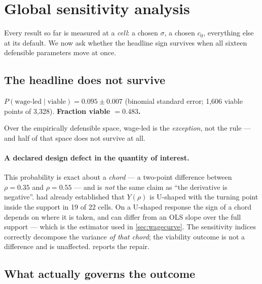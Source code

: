 
\section{Global sensitivity analysis}
\label{sec:sa}

Every result so far is measured at a \emph{cell}: a chosen $\sigma$, a chosen
$c_0$, everything else at its default. We now ask whether the headline sign
survives when all sixteen defensible parameters move at once.

\subsection{The headline does not survive}

\begin{declbox}
\textbf{$P(\text{wage-led} \mid \text{viable}) = 0.095 \pm 0.007$}
(binomial standard error; 1{,}606 viable points of 3{,}328).
\textbf{Fraction viable $= 0.483$.}

\smallskip
Over the empirically defensible space, wage-led is the \emph{exception}, not
the rule --- and half of that space does not survive at all.
\end{declbox}

\paragraph{A declared design defect in the quantity of interest.}
This probability is exact about a \emph{chord} --- a two-point difference
between $\rho = 0.35$ and $\rho = 0.55$ --- and is \emph{not} the same claim as
``the derivative is negative''.  had already
established that $Y(\rho)$ is U-shaped with the turning point inside the
support in 19 of 22 cells. On a U-shaped response the sign of a chord depends
on where it is taken, and can differ from an OLS slope over the full support
--- which is the estimator used in \cref{sec:wagecurve}. The sensitivity
indices correctly decompose the variance \emph{of that chord}; the viability
outcome is not a difference and is unaffected.  reports the
repair.

\subsection{What actually governs the outcome}

